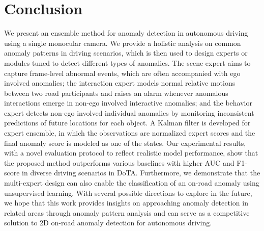 \section{Conclusion}
We present an ensemble method for anomaly detection in autonomous driving using a single monocular camera. We provide a holistic analysis on common anomaly patterns in driving scenarios, which is then used to design experts or modules tuned to detect different types of anomalies. The scene expert aims to capture frame-level abnormal events, which are often accompanied with ego involved anomalies; the interaction expert models normal relative motions between two road participants and raises an alarm whenever anomalous interactions emerge in non-ego involved interactive anomalies; and the behavior expert detects non-ego involved individual anomalies by monitoring inconsistent predictions of future locations for each object. A Kalman filter is developed for expert ensemble, in which the observations are normalized expert scores and the final anomaly score is modeled as one of the states. Our experimental results, with a novel evaluation protocol to reflect realistic model performance, show that the proposed method outperforms various baselines with higher AUC and F1-score in diverse driving scenarios in DoTA. Furthermore, we demonstrate that the multi-expert design can also enable the classification of an on-road anomaly using unsupervised learning. With several possible directions to explore in the future, we hope that this work provides insights on approaching anomaly detection in related areas through anomaly pattern analysis and can serve as a competitive solution to 2D on-road anomaly detection for autonomous driving.